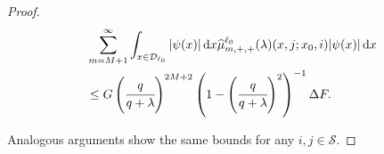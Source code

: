\begin{proof}
        
        \begin{align}
	         & \sum_{m=M+1}^\infty \int_{x\in\mathcal{D}_{\ell_0}} |\psi(x)|\, \mathrm{d} x \widehat \mu^{\ell_0}_{m,+,+}(\lambda)(x,j;x_0,i) |\psi(x)|\, \mathrm{d} x \nonumber
	        \\&\leq G\left(\cfrac{q}{q+\lambda}\right)^{2M+2} \left(1-\left(\cfrac{q}{q+\lambda}\right)^2\right)^{-1}\Delta F.
        \end{align}
        
	Analogous arguments show the same bounds for any \(i,j\in\mathcal S\). 
\end{proof}

